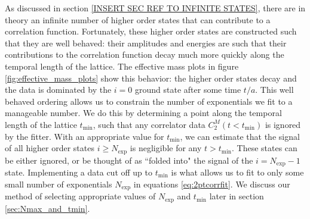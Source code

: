 As discussed in section \ref{INSERT SEC REF TO INFINITE STATES}, there are in theory an infinite number of higher order states that can contribute to a correlation function.  Fortunately, these higher order states are constructed such that they are well behaved: their amplitudes and energies are such that their contributions to the correlation function decay much more quickly along the temporal length of the lattice.  The effective mass plots in figure \ref{fig:effective_mass_plots} show this behavior: the higher order states decay and the data is dominated by the $i=0$ ground state after some time $t/a$.  This well behaved ordering allows us to constrain the number of exponentials we fit to a manageable number. We do this by determining a point along the temporal length of the lattice $t_\mathrm{min}$, such that any correlator data $C^M_2(t<t_\mathrm{min})$ is ignored by the fitter.  With an appropriate value for $t_\mathrm{min}$, we can estimate that the signal of all higher order states  $i \geq N_\mathrm{exp}$ is negligible for any $t>t_\mathrm{min}$.  These states can be either ignored, or be thought of as ``folded into" the signal of the $i = N_\mathrm{exp}-1$ state.  Implementing a data cut off up to $t_\mathrm{min}$ is what allows us to fit to only some small number of exponentials $N_\mathrm{exp}$ in equations \ref{eq:2ptcorrfit}.   We discuss our method of selecting appropriate values of $N_\mathrm{exp}$ and $t_\mathrm{min}$ later in section \ref{sec:Nmax_and_tmin}. 

